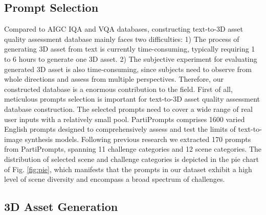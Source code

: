 \subsection{Prompt Selection}
Compared to AIGC IQA and VQA databases, constructing text-to-3D asset quality assessment database mainly faces two difficulties: 1) The process of generating 3D asset from text is currently time-consuming, typically requiring 1 to 6 hours to generate one 3D asset. 2) The subjective experiment for evaluating generated 3D asset is also time-consuming, since subjects need to observe from whole directions and assess from multiple perspectives. Therefore, our constructed database is a enormous contribution to the field. First of all, meticulous prompts selection is important for text-to-3D asset quality assessment database construction. The selected prompts need to cover a wide range of real user inputs with a relatively small pool. PartiPrompts \cite{yu2022scaling} comprises 1600 varied English prompts designed to comprehensively assess and test the limits of text-to-image synthesis models. Following previous research \cite{wang2023aigciqa2023} we extracted 170 prompts from PartiPrompts, spanning 11 challenge categories and 12 scene categories. The distribution of selected scene and challenge categories is depicted in the pie chart of Fig. \ref{fig:pie}, which manifests that the prompts in our dataset exhibit a high level of scene diversity and encompass a broad spectrum of challenges.
\vspace{-15pt}
\subsection{3D Asset Generation}

